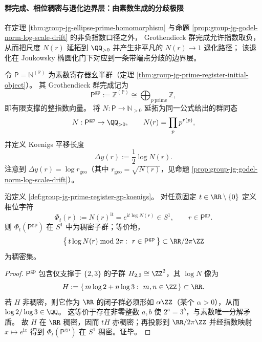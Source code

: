 

\paragraph{群完成、相位稠密与退化边界层：由素数生成的分歧极限}
在定理 \ref{thm:group-jg-ellipse-prime-homomorphism} 与命题 \ref{prop:group-jg-godel-norm-log-scale-drift} 的非负指数口径之外，
Grothendieck 群完成允许指数取负，从而把尺度 \(N(r)\) 延拓到 \(\QQ_{>0}\) 并产生非平凡的 \(N(r)\to 1\) 退化路径；
该退化在 Joukowsky 椭圆化门下对应到一条带端点分歧的边界层。

\begin{definition}\label{def:group-jg-prime-register-gp-koenigs}
令 \(\mathsf{P}=\mathbb N^{(\mathbb P)}\) 为素数寄存器幺半群（定理 \ref{thm:group-jg-prime-register-initial-object}）。
其 Grothendieck 群完成记为
\[
\mathsf{P}^{\mathrm{gp}}:=\mathbb Z^{(\mathbb P)}\cong \bigoplus_{p\ \mathrm{prime}}\mathbb Z,
\]
即有限支撑的整指数向量。
将 \(N:\mathsf P\to\mathbb N_{>0}\) 延拓为同一公式给出的群同态
\[
N:\mathsf{P}^{\mathrm{gp}}\to \QQ_{>0},\qquad
N(r)=\prod_{p}p^{r(p)},
\]
并定义 Koenigs 平移长度
\[
\Delta y(r):=\frac12\log N(r).
\]
注意到 \(\Delta y(r)=\log r_{\mathrm{geo}}\)（其中 \(r_{\mathrm{geo}}=\sqrt{N(r)}\)，见命题 \ref{prop:group-jg-godel-norm-log-scale-drift}）。
\end{definition}

\begin{theorem}\label{thm:group-jg-prime-register-phase-bohr-dense}
沿定义 \ref{def:group-jg-prime-register-gp-koenigs}。
对任意固定 \(t\in\RR\setminus\{0\}\) 定义相位字符
\[
\Phi_t(r):=N(r)^{\mathrm{i}t}=e^{\mathrm{i}t\log N(r)}\in S^1,\qquad r\in \mathsf{P}^{\mathrm{gp}}.
\]
则 \(\Phi_t(\mathsf{P}^{\mathrm{gp}})\) 在 \(S^1\) 中为稠密子群；等价地，
\[
\bigl\{\,t\log N(r)\bmod 2\pi:\ r\in \mathsf{P}^{\mathrm{gp}}\,\bigr\}
\subset \RR/2\pi\ZZ
\]
为稠密集。
\end{theorem}
\begin{proof}
\(\mathsf{P}^{\mathrm{gp}}\) 包含仅支撑于 \(\{2,3\}\) 的子群 \(H_{2,3}\cong\ZZ^2\)，其 \(\log N\) 像为
\[
H:=\{\,m\log 2+n\log 3:\ m,n\in\ZZ\,\}\subset\RR.
\]
若 \(H\) 非稠密，则它作为 \(\RR\) 的闭子群必须形如 \(\alpha\ZZ\)（某个 \(\alpha>0\)），从而 \(\log 2/\log 3\in\QQ\)。
这等价于存在非零整数 \(a,b\) 使 \(2^a=3^b\)，与素数唯一分解矛盾。
故 \(H\) 在 \(\RR\) 稠密，因而 \(tH\) 亦稠密；再投影到 \(\RR/2\pi\ZZ\) 并经指数映射 \(x\mapsto e^{\mathrm{i}x}\) 得到 \(\Phi_t(\mathsf{P}^{\mathrm{gp}})\) 在 \(S^1\) 稠密。证毕。
\end{proof}

